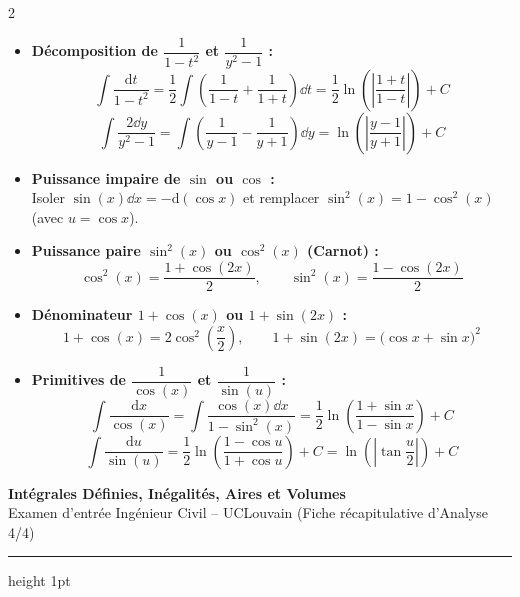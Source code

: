 {\begin{multicols}{2}
\vspace{3pt}
\begin{itemize}[leftmargin=1.2em, itemsep=2pt, topsep=2pt]
    \item \textbf{Décomposition de $\dfrac{1}{1 - t^2}$ et $\dfrac{1}{y^2 - 1}$ :}
    \[
        \int \frac{\mathrm{d}t}{1 - t^2} = \frac{1}{2}\int \left(\frac{1}{1-t} + \frac{1}{1+t}\right)\dd t = \frac{1}{2}\ln\left(\left|\frac{1+t}{1-t}\right|\right) + C
    \]
    \[
        \int \frac{2\dd y}{y^2 - 1} = \int \left(\frac{1}{y-1} - \frac{1}{y+1}\right)\dd y = \ln\left(\left|\frac{y-1}{y+1}\right|\right) + C
    \]
    \item \textbf{Puissance impaire de $\sin$ ou $\cos$ :}\\
    Isoler $\sin(x)\dd x = -\mathrm{d}(\cos x)$ et remplacer $\sin^2(x) = 1 - \cos^2(x)$ (avec $u = \cos x$).
    \item \textbf{Puissance paire $\sin^2(x)$ ou $\cos^2(x)$ (Carnot) :}
    \[
        \cos^2(x) = \frac{1 + \cos(2x)}{2}, \qquad \sin^2(x) = \frac{1 - \cos(2x)}{2}
    \]
    \item \textbf{Dénominateur $1 + \cos(x)$ ou $1 + \sin(2x)$ :}
    \[
        1 + \cos(x) = 2\cos^2\left(\frac{x}{2}\right), \qquad 1 + \sin(2x) = \bigl(\cos x + \sin x\bigr)^2
    \]
    \item \textbf{Primitives de $\dfrac{1}{\cos(x)}$ et $\dfrac{1}{\sin(u)}$ :}
    \[
        \int \frac{\mathrm{d}x}{\cos(x)} = \int \frac{\cos(x)\dd x}{1 - \sin^2(x)} = \frac{1}{2}\ln\left(\frac{1+\sin x}{1-\sin x}\right) + C
    \]
    \[
        \int \frac{\mathrm{d}u}{\sin(u)} = \frac{1}{2}\ln\left(\frac{1-\cos u}{1+\cos u}\right) + C = \ln\left(\left|\tan\frac{u}{2}\right|\right) + C
    \]
\end{itemize}

\end{multicols}
}

\newpage
\thispagestyle{plain}

\begin{center}
    {\LARGE\bfseries\color{uclblue} Intégrales Définies, Inégalités, Aires et Volumes}\\[2pt]
    {\small\color{darkgray} Examen d'entrée Ingénieur Civil -- UCLouvain (Fiche récapitulative d'Analyse 4/4)}
    \vspace{2pt}
    \hrule height 1pt
\end{center}
\vspace{-6pt}

